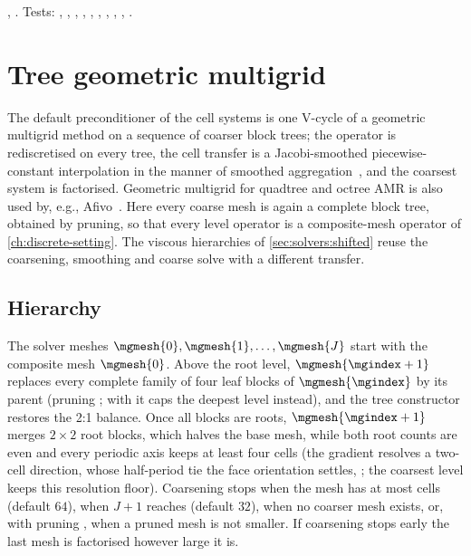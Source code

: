 \begin{implnote}
,
.
Tests: ,
,
,
,
,
,
,
,
,
.
\end{implnote}

\section{Tree geometric multigrid}\label{sec:solvers:multigrid}
The default preconditioner of the cell systems is one V-cycle of a geometric
multigrid method on a sequence of coarser block trees; the operator is
rediscretised on every tree, the cell transfer is a Jacobi-smoothed
piecewise-constant interpolation in the manner of smoothed
aggregation~\cite{vanek1996}, and the coarsest system is factorised. Geometric
multigrid for quadtree and octree AMR is also used by, e.g.,
Afivo~\cite{teunissen2018}. Here every coarse mesh is again a complete block
tree, obtained by pruning, so that every level operator is a composite-mesh
operator of \cref{ch:discrete-setting}.
The viscous hierarchies of \cref{sec:solvers:shifted} reuse the coarsening,
smoothing and coarse solve with a different transfer.

\subsection{Hierarchy}\label{sec:solvers:hierarchy}
The solver meshes $\mgmesh{0},\mgmesh{1},\dots,\mgmesh{J}$ start with the
composite mesh $\mgmesh{0}$. Above the root level, $\mgmesh{\mgindex+1}$
replaces every complete family of four leaf blocks of $\mgmesh{\mgindex}$ by
its parent (pruning ; with  it caps the deepest
level instead), and the tree constructor restores the 2:1 balance. Once all
blocks are roots, $\mgmesh{\mgindex+1}$ merges $2\times2$ root blocks, which
halves the base mesh, while both root counts are even and every periodic axis
keeps at least four cells (the gradient resolves a two-cell direction, whose
half-period tie the face orientation settles, ; the coarsest level
keeps this resolution floor). Coarsening stops when the mesh has at most
 cells (default $64$), when $J+1$ reaches 
(default $32$), when no coarser mesh exists, or, with pruning ,
when a pruned mesh is not smaller. If coarsening stops early the last mesh is
factorised however large it is.

